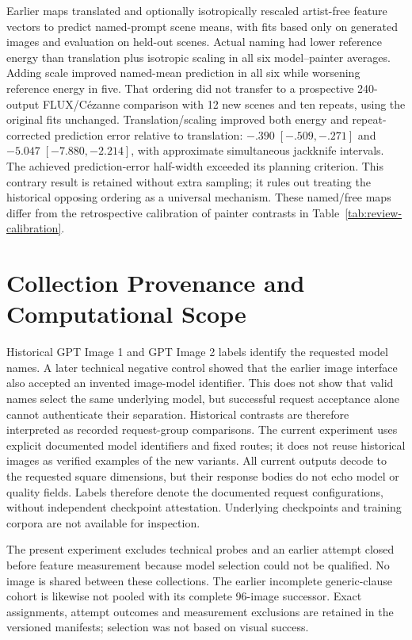 Earlier maps translated and optionally isotropically rescaled artist-free feature
vectors to predict named-prompt scene means, with fits based only on generated
images and evaluation on held-out scenes. Actual naming had lower reference energy than
translation plus isotropic scaling in all six model--painter averages. Adding
scale improved named-mean prediction in all six while worsening reference
energy in five. That ordering did not transfer to a prospective 240-output
FLUX/C\'ezanne comparison with 12 new scenes and ten repeats, using the original
fits unchanged. Translation/scaling improved both energy and repeat-corrected
prediction error relative to translation: $-.390\;[-.509,-.271]$ and
$-5.047\;[-7.880,-2.214]$, with approximate simultaneous jackknife intervals.
The achieved prediction-error half-width exceeded its planning criterion.
This contrary result is retained without extra sampling; it rules out treating
the historical opposing ordering as a universal mechanism. These named/free maps
differ from the retrospective calibration of painter contrasts in
Table~\ref{tab:review-calibration}.

\section{Collection Provenance and Computational Scope}\label{app:provenance}
Historical GPT Image 1 and GPT Image 2 labels identify the requested model
names. A later technical negative control showed that the earlier image
interface also accepted an invented image-model identifier. This does not show
that valid names select the same underlying model, but successful request
acceptance alone cannot authenticate their separation. Historical contrasts
are therefore interpreted as recorded request-group comparisons. The current
experiment uses explicit documented model identifiers and fixed routes;
it does not reuse historical images as verified examples of the new variants.
All current outputs decode to the requested square dimensions, but their
response bodies do not echo model or quality fields. Labels therefore denote
the documented request configurations, without independent checkpoint
attestation. Underlying checkpoints and training corpora are not available
for inspection.

The present experiment excludes technical probes and an earlier attempt closed
before feature measurement because model selection could not be qualified.
No image is shared between these collections. The earlier incomplete
generic-clause cohort is likewise not pooled with its complete 96-image
successor. Exact assignments, attempt outcomes and measurement exclusions are
retained in the versioned manifests; selection was not based on visual success.

